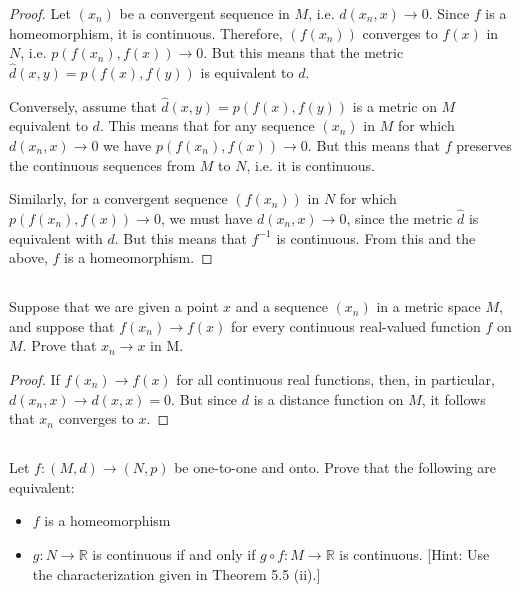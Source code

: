\begin{proof}
Let $(x_n)$ be a convergent sequence in $M$, i.e. $d(x_n, x) \rightarrow 0$. Since $f$ is a homeomorphism, it is continuous. Therefore, $(f(x_n))$ converges to $f(x)$ in $N$, i.e. $p(f(x_n), f(x)) \rightarrow 0$. But this means that the metric $\hat{d}(x,y)=p(f(x), f(y))$ is equivalent to $d$.

Conversely, assume that $\hat{d}(x,y)=p(f(x), f(y))$ is a metric on $M$ equivalent to $d$. This means that for any sequence $(x_n)$ in $M$ for which $d(x_n, x) \rightarrow 0$ we have $p(f(x_n), f(x)) \rightarrow 0$. But this means that $f$ preserves the continuous sequences from $M$ to $N$, i.e. it is continuous. 

Similarly, for a convergent sequence $(f(x_n))$ in $N$ for which $p(f(x_n), f(x)) \rightarrow 0$, we must have $d(x_n, x) \rightarrow 0$, since the metric $\hat{d}$ is equivalent with $d$. But this means that $f^{-1}$ is continuous. From this and the above, $f$ is a homeomorphism.

\end{proof}


\subsection{} Suppose that we are given a point $x$  and a sequence $(x_n)$  in a metric space $M$, and suppose that $f(x_n) \rightarrow f(x)$ for every continuous real-valued function $f$ on $M$. Prove that $x_n \rightarrow x$ in M.

\begin{proof}

If $f(x_n) \rightarrow f(x)$ for all continuous real functions, then, in particular, $d(x_n, x) \rightarrow d(x, x) = 0$. But since $d$ is a distance function on $M$, it follows that $x_n$ converges to $x$.

\end{proof}

\newpage

\subsection{} Let $f :(M, d) \rightarrow (N, p)$ be one-to-one and onto. Prove that the following are equivalent:
\begin{itemize}
    \item $f$ is a homeomorphism
    \item $g : N \rightarrow \mathbb{R}$ is continuous if and only if $g \circ f : M \rightarrow \mathbb{R}$ is continuous. [Hint: Use the characterization given in Theorem 5.5 (ii).]
\end{itemize}

